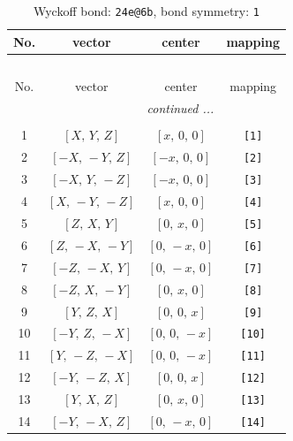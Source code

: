 \documentclass[fleqn,8pt]{jsarticle}
\begin{document}
\begin{longtable}{cccc}
\caption{Wyckoff bond: {\tt 24e@6b}, bond symmetry: {\tt 1}}
 \\
 \hline \hline
No. & vector & center & mapping \\ \hline \endfirsthead

\multicolumn{3}{l}{\tablename\ \thetable{}} \\
 \hline \hline
No. & vector & center & mapping \\ \hline \endhead

 \hline \hline
\multicolumn{3}{r}{\footnotesize\it continued ...} \\ \endfoot

 \hline \hline
\multicolumn{3}{r}{} \\ \endlastfoot

1 & $\left[ X,\, Y,\, Z \right]$ & $\left[ x,\, 0,\, 0 \right]$ & {\tt [1]} \\ \hline
2 & $\left[ - X,\, - Y,\, Z \right]$ & $\left[ - x,\, 0,\, 0 \right]$ & {\tt [2]} \\ \hline
3 & $\left[ - X,\, Y,\, - Z \right]$ & $\left[ - x,\, 0,\, 0 \right]$ & {\tt [3]} \\ \hline
4 & $\left[ X,\, - Y,\, - Z \right]$ & $\left[ x,\, 0,\, 0 \right]$ & {\tt [4]} \\ \hline
5 & $\left[ Z,\, X,\, Y \right]$ & $\left[ 0,\, x,\, 0 \right]$ & {\tt [5]} \\ \hline
6 & $\left[ Z,\, - X,\, - Y \right]$ & $\left[ 0,\, - x,\, 0 \right]$ & {\tt [6]} \\ \hline
7 & $\left[ - Z,\, - X,\, Y \right]$ & $\left[ 0,\, - x,\, 0 \right]$ & {\tt [7]} \\ \hline
8 & $\left[ - Z,\, X,\, - Y \right]$ & $\left[ 0,\, x,\, 0 \right]$ & {\tt [8]} \\ \hline
9 & $\left[ Y,\, Z,\, X \right]$ & $\left[ 0,\, 0,\, x \right]$ & {\tt [9]} \\ \hline
10 & $\left[ - Y,\, Z,\, - X \right]$ & $\left[ 0,\, 0,\, - x \right]$ & {\tt [10]} \\ \hline
11 & $\left[ Y,\, - Z,\, - X \right]$ & $\left[ 0,\, 0,\, - x \right]$ & {\tt [11]} \\ \hline
12 & $\left[ - Y,\, - Z,\, X \right]$ & $\left[ 0,\, 0,\, x \right]$ & {\tt [12]} \\ \hline
13 & $\left[ Y,\, X,\, Z \right]$ & $\left[ 0,\, x,\, 0 \right]$ & {\tt [13]} \\ \hline
14 & $\left[ - Y,\, - X,\, Z \right]$ & $\left[ 0,\, - x,\, 0 \right]$ & {\tt [14]} \\ \hline

\end{longtable}
\end{document}
